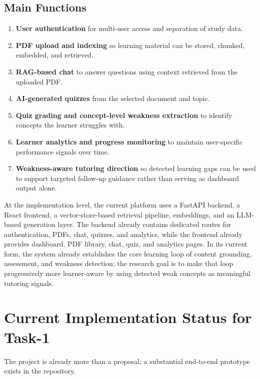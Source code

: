 \documentclass[11pt,a4paper]{article}
\begin{document}
\subsection{Main Functions}
\begin{enumerate}
    \item \textbf{User authentication} for multi-user access and separation of study data.
    \item \textbf{PDF upload and indexing} so learning material can be stored, chunked, embedded, and retrieved.
    \item \textbf{RAG-based chat} to answer questions using context retrieved from the uploaded PDF.
    \item \textbf{AI-generated quizzes} from the selected document and topic.
    \item \textbf{Quiz grading and concept-level weakness extraction} to identify concepts the learner struggles with.
    \item \textbf{Learner analytics and progress monitoring} to maintain user-specific performance signals over time.
    \item \textbf{Weakness-aware tutoring direction} so detected learning gaps can be used to support targeted follow-up guidance rather than serving as dashboard output alone.
\end{enumerate}

At the implementation level, the current platform uses a FastAPI backend, a React frontend, a vector-store-based retrieval pipeline, embeddings, and an LLM-based generation layer. The backend already contains dedicated routes for authentication, PDFs, chat, quizzes, and analytics, while the frontend already provides dashboard, PDF library, chat, quiz, and analytics pages. In its current form, the system already establishes the core learning loop of content grounding, assessment, and weakness detection; the research goal is to make that loop progressively more learner-aware by using detected weak concepts as meaningful tutoring signals.

\section{Current Implementation Status for Task-1}
The project is already more than a proposal; a substantial end-to-end prototype exists in the repository.
\end{document}
